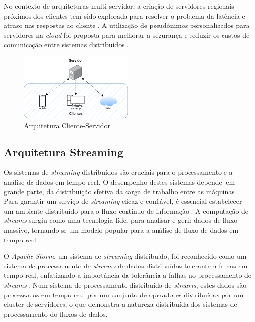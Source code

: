 No contexto de arquiteturas multi servidor, a criação de servidores regionais próximos dos clientes 
tem sido explorada para resolver o problema da latência e atraso nas respostas ao cliente 
\cite{clientserver2022b}. A utilização de pseudónimos personalizados para servidores na 
\textit{cloud} foi proposta para melhorar a segurança e reduzir os custos de comunicação entre
sistemas distribuídos \cite{clientserver2017}.

\begin{figure}[H]
    \centering
    \includegraphics[width=0.5\textwidth]{media/content/estado-arte/client-server.png}
    \caption{Arquitetura Cliente-Servidor}
    \label{fig:client-server}
\end{figure}

\subsection{Arquitetura Streaming}

Os sistemas de \textit{streaming} distribuídos são cruciais para o processamento e a análise de dados 
em tempo real. O desempenho destes sistemas depende, em grande parte, da distribuição efetiva da 
carga de trabalho entre as máquinas \cite{stream2020}. Para garantir um serviço de \textit{streaming} 
eficaz e confiável, é essencial estabelecer um ambiente distribuído para o fluxo contínuo de 
informação \cite{stream2014}. A computação de \textit{streams} surgiu como uma tecnologia líder 
para analisar e gerir dados de fluxo massivo, tornando-se um modelo popular para a análise de 
fluxo de dados em tempo real \cite{stream2018} \cite{stream2018b}.

O \textit{Apache Storm}, um sistema de \textit{streaming} distribuído, foi reconhecido como um 
sistema de processamento de \textit{streams} de dados distribuídos tolerante a falhas em tempo real, 
enfatizando a importância da tolerância a falhas no processamento de \textit{streams} 
\cite{stormattwitter}. Num sistema de processamento distribuído de \textit{streams}, estes dados 
são processados em tempo real por um conjunto de operadores distribuídos por um \gls{cluster}
de servidores, o que demonstra a natureza distribuída dos sistemas de processamento do fluxos de dados.

